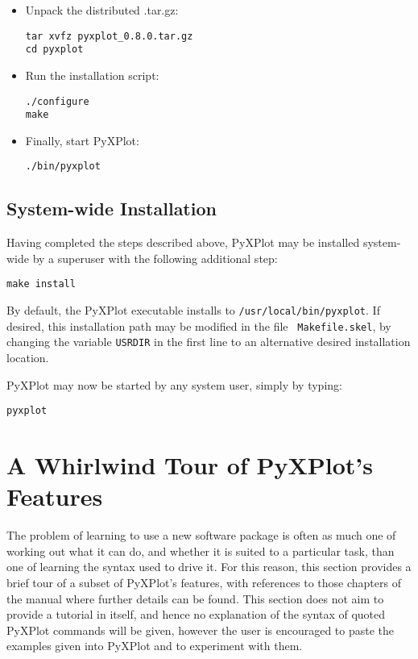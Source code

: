\begin{itemize}
\item Unpack the distributed .tar.gz:

\begin{verbatim}
tar xvfz pyxplot_0.8.0.tar.gz
cd pyxplot
\end{verbatim}

\item Run the installation script:

\begin{verbatim}
./configure
make
\end{verbatim}

\item Finally, start PyXPlot:

\begin{verbatim}
./bin/pyxplot
\end{verbatim}

\end{itemize}

\subsection{System-wide Installation}

Having completed the steps described above, PyXPlot may be installed
system-wide by a superuser with the following additional
step:

\begin{verbatim}
make install
\end{verbatim}

By default, the PyXPlot executable installs to {\tt /usr/local/bin/pyxplot}.
If desired, this installation path may be modified in the file {\tt
Makefile.skel}, by changing the variable {\tt USRDIR} in the first line to an
alternative desired installation location.

PyXPlot may now be started by any system user, simply by typing:

\begin{verbatim}
pyxplot
\end{verbatim}

\section{A Whirlwind Tour of PyXPlot's Features}

The problem of learning to use a new software package is often as much one of
working out what it can do, and whether it is suited to a particular task, than
one of learning the syntax used to drive it. For this reason, this section
provides a brief tour of a subset of PyXPlot's features, with references to
those chapters of the manual where further details can be found. This section
does not aim to provide a tutorial in itself, and hence no explanation of the
syntax of quoted PyXPlot commands will be given, however the user is encouraged
to paste the examples given into PyXPlot and to experiment with them.


